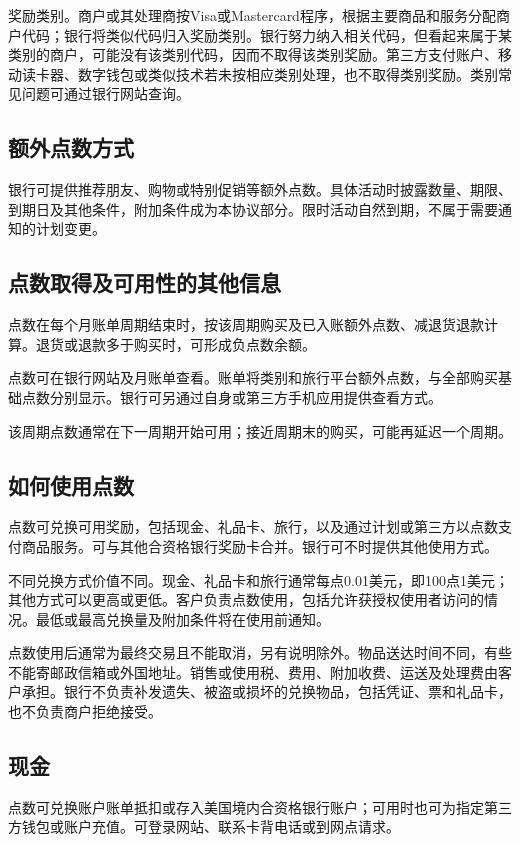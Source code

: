 \documentclass[UTF8,fontset=none,11pt,a4paper]{ctexart}
\begin{document}
奖励类别。商户或其处理商按Visa或Mastercard程序，根据主要商品和服务分配商户代码；银行将类似代码归入奖励类别。银行努力纳入相关代码，但看起来属于某类别的商户，可能没有该类别代码，因而不取得该类别奖励。第三方支付账户、移动读卡器、数字钱包或类似技术若未按相应类别处理，也不取得类别奖励。类别常见问题可通过银行网站查询。


\subsection*{额外点数方式}
银行可提供推荐朋友、购物或特别促销等额外点数。具体活动时披露数量、期限、到期日及其他条件，附加条件成为本协议部分。限时活动自然到期，不属于需要通知的计划变更。


\subsection*{点数取得及可用性的其他信息}
点数在每个月账单周期结束时，按该周期购买及已入账额外点数、减退货退款计算。退货或退款多于购买时，可形成负点数余额。


点数可在银行网站及月账单查看。账单将类别和旅行平台额外点数，与全部购买基础点数分别显示。银行可另通过自身或第三方手机应用提供查看方式。


该周期点数通常在下一周期开始可用；接近周期末的购买，可能再延迟一个周期。


\subsection*{如何使用点数}
点数可兑换可用奖励，包括现金、礼品卡、旅行，以及通过计划或第三方以点数支付商品服务。可与其他合资格银行奖励卡合并。银行可不时提供其他使用方式。


不同兑换方式价值不同。现金、礼品卡和旅行通常每点0.01美元，即100点1美元；其他方式可以更高或更低。客户负责点数使用，包括允许获授权使用者访问的情况。最低或最高兑换量及附加条件将在使用前通知。


点数使用后通常为最终交易且不能取消，另有说明除外。物品送达时间不同，有些不能寄邮政信箱或外国地址。销售或使用税、费用、附加收费、运送及处理费由客户承担。银行不负责补发遗失、被盗或损坏的兑换物品，包括凭证、票和礼品卡，也不负责商户拒绝接受。


\subsection*{现金}
点数可兑换账户账单抵扣或存入美国境内合资格银行账户；可用时也可为指定第三方钱包或账户充值。可登录网站、联系卡背电话或到网点请求。
\end{document}
